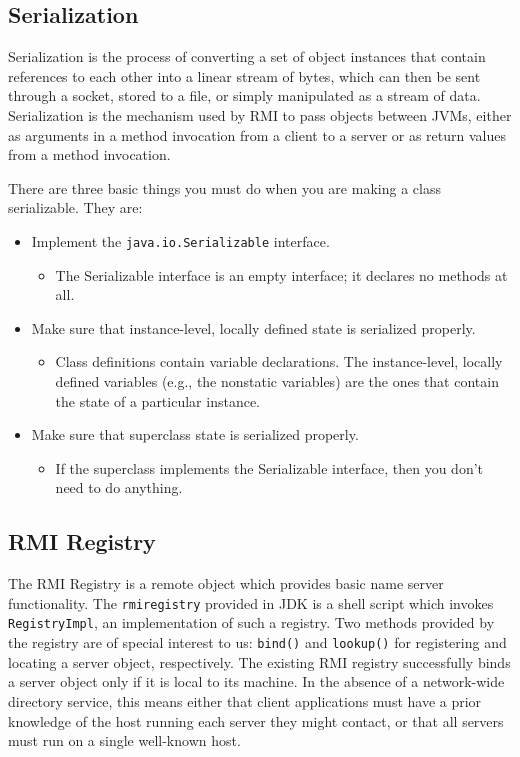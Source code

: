 \subsection{Serialization}
Serialization is the process of converting a set of object instances that contain references to each other into a linear stream of bytes, which can then be sent through a socket, stored to a file, or simply manipulated as a stream of data. Serialization is the mechanism used by RMI to pass objects between JVMs, either as arguments in a method invocation from a client to a server or as return values from a method invocation. \cite{JavaRMIOreilly}

There are three basic things you must do when you are making a class serializable. They are:

\begin{itemize}
    \item Implement the \texttt{java.io.Serializable} interface.
    \begin{itemize}
        \item The Serializable interface is an empty interface; it declares no methods at all.
    \end{itemize}
    \item Make sure that instance-level, locally defined state is serialized properly.
    \begin{itemize}
        \item Class definitions contain variable declarations. The instance-level, locally defined variables (e.g., the nonstatic variables) are the ones that contain the state of a particular instance.
    \end{itemize}
    \item Make sure that superclass state is serialized properly.
    \begin{itemize}
        \item If the superclass implements the Serializable interface, then you don't need to do anything.
    \end{itemize}
\end{itemize}

\subsection{RMI Registry}

The RMI Registry is a remote object which provides basic name server functionality. The \texttt{rmiregistry} provided in JDK is a shell script which invokes \texttt{RegistryImpl}, an implementation of such a registry. Two methods provided by the registry are of special interest to us: \texttt{bind()} and \texttt{lookup()} for registering and locating a server object, respectively. The existing RMI registry successfully binds a server object only if it is local to its machine. In the absence of a network-wide directory service, this means either that client applications must have a prior knowledge of the host running each server they might contact, or that all servers must run on a single well-known host. \cite{NetworkComputingWithJavaApplets}